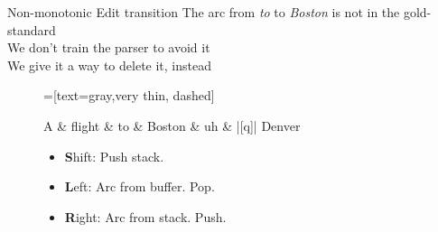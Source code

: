 \documentclass[color=usenames,dvipsnames]{lecture}
\begin{document}
\begin{plain}{Non-monotonic Edit transition}
The arc from \emph{to} to \emph{Boston} is not in the gold-standard\\
We don't train the parser to avoid it\\
We give it a way to delete it, instead
\begin{figure}
    \centering
    \begin{dependency}[theme=simple]
    =[text=gray,very thin, dashed]
    \begin{deptext}[column sep=.075cm, row sep=.1ex]
        A \& flight \& to \&  Boston \&  uh \& |[q]| Denver \\
    \end{deptext}
\end{dependency}

\begin{itemize}
  \item \textbf{S}hift: Push stack.
  \item \textbf{L}eft: Arc from buffer. Pop.
  \item \textbf{R}ight: Arc from stack. Push.
\end{itemize}

\end{figure}
\end{plain}
\end{document}
